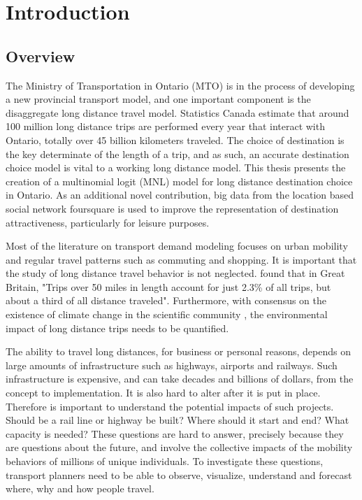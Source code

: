 \chapter{Introduction}
\section{Overview}
The Ministry of Transportation in Ontario (MTO) is in the process of developing a new provincial transport model, and one important component is the disaggregate long distance travel model. Statistics Canada estimate that around 100 million long distance trips are performed every year that interact with Ontario, totally over 45 billion kilometers traveled. The choice of destination is the key determinate of the length of a trip, and as such, an accurate destination choice model is vital to a working long distance model. This thesis presents the creation of a multinomial logit (MNL) model for long distance destination choice in Ontario. As an additional novel contribution, big data from the location based social network foursquare is used to improve the representation of destination attractiveness, particularly for leisure purposes.

Most of the literature on transport demand modeling focuses on urban mobility and regular travel patterns such as commuting and shopping. It is important that the study of long distance travel behavior is not neglected. \textcite{rohr2010modelling} found that in Great Britain, "Trips over 50 miles in length account for just 2.3\% of all trips, but about a third of all distance traveled". Furthermore, with  consensus on the existence of climate change in the scientific community \parencite{oreskes2004scientific}, the environmental impact of long distance trips needs to be quantified. 

The ability to travel long distances, for business or personal reasons, depends on large amounts of infrastructure such as highways, airports and railways. Such infrastructure is expensive, and can take decades and billions of dollars, from the concept to implementation. It is also hard to alter after it is put in place. Therefore is important to understand the potential impacts of such projects. Should be a rail line or highway be built? Where should it start and end? What capacity is needed? These questions are hard to answer, precisely because they are questions about the future, and involve the collective impacts of the mobility behaviors of millions of unique individuals. To investigate these questions, transport planners need to be able to observe, visualize, understand and forecast where, why and how people travel. 

